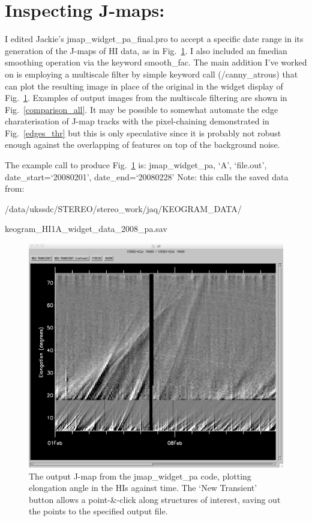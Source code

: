 \documentclass[12pt, a4paper, oneside]{article}
\begin{document}
\section{Inspecting J-maps:}

I edited Jackie's jmap\_widget\_pa\_final.pro to accept a specific date range in its generation of the J-maps of HI data, as in Fig.~\ref{jmap}. I also included an fmedian smoothing operation via the keyword smooth\_fac. The main addition I've worked on is employing a multiscale filter by simple keyword call (/canny\_atrous) that can plot the resulting image in place of the original in the widget display of Fig.~\ref{jmap}. Examples of output images from the multiscale filtering are shown in Fig.~\ref{comparison_all}. It may be possible to somewhat automate the edge charaterisation of J-map tracks with the pixel-chaining demonstrated in Fig.~\ref{edges_thr} but this is only speculative since it is probably not robust enough against the overlapping of features on top of the background noise. 

\noindent The example call to produce Fig.~\ref{jmap} is:
\newline
\newline
jmap\_widget\_pa, `A', `file.out', date\_start=`20080201', date\_end=`20080228'
\newline
\newline
Note: this calls the saved data from:

/data/ukssdc/STEREO/stereo\_work/jaq/KEOGRAM\_DATA/

keogram\_HI1A\_widget\_data\_2008\_pa.sav


\begin{figure}[]
\centering
\includegraphics[width=\textwidth]{../images/jmap.png}
\caption{The output J-map from the jmap\_widget\_pa code, plotting elongation angle in the HIs against time. The `New Transient' button allows a point-\&-click along structures of interest, saving out the points to the specified output file.}
\label{jmap}
\end{figure}
\end{document}
